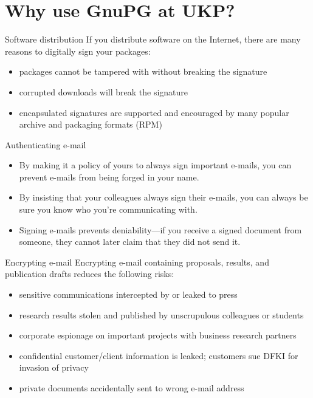\documentclass[%
mode=present,%
paper=smartboard,
size=20pt,
]{powerdot}
\begin{document}
\section{Why use GnuPG at UKP?}
\begin{slide}{Software distribution}
  If you distribute software on the Internet, there are many reasons
  to digitally sign your packages:\\[1ex]
  \begin{itemize}
  \item packages cannot be tampered with without breaking the signature
  \item corrupted downloads will break the signature
  \item encapsulated signatures are supported and encouraged by many
    popular archive and packaging formats (\eg RPM)
  \end{itemize}
\end{slide}

\begin{slide}{Authenticating e-mail}
  \begin{itemize}
  \item By making it a policy of yours to always sign important
    e-mails, you can prevent e-mails from being forged in your name.
  \item By insisting that your colleagues always sign their e-mails,
    you can always be sure you know who you're communicating with.
  \item Signing e-mails prevents deniability---if you receive a signed
    document from someone, they cannot later claim that they did not
    send it.
  \end{itemize}
\end{slide}

\begin{slide}{Encrypting e-mail}
  Encrypting e-mail containing proposals, results, and publication
  drafts reduces the following risks:\\[1ex]
  \begin{itemize}
  \item sensitive communications intercepted by or leaked to press
  \item research results stolen and published by unscrupulous
    colleagues or students
  \item corporate espionage on important projects with business
    research partners
  \item confidential customer/client information is leaked; customers
    sue DFKI for invasion of privacy
  \item private documents accidentally sent to wrong e-mail address
  \end{itemize}
\end{slide}
\end{document}
